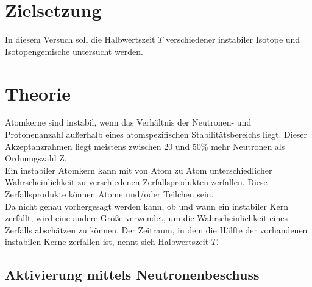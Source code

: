 \section{Zielsetzung}
In diesem Versuch soll die Halbwertszeit $T$ verschiedener instabiler Isotope und Isotopengemische 
untersucht werden.

\section{Theorie}
\label{sec:Theorie}

Atomkerne sind instabil, wenn das Verhältnis der Neutronen- und Protonenanzahl außerhalb eines atomspezifischen
Stabilitätsbereichs liegt. Dieser Akzeptanzrahmen liegt meistens zwischen 20 und 50\% mehr
Neutronen als Ordnungszahl Z.\\
Ein instabiler Atomkern kann mit von Atom zu Atom unterschiedlicher Wahrscheinlichkeit zu verschiedenen
Zerfallsprodukten zerfallen. Diese Zerfallsprodukte können Atome und/oder Teilchen sein.\\
Da nicht genau vorhergesagt werden kann, ob und wann ein instabiler Kern zerfällt, wird eine andere Größe verwendet, 
um die Wahrscheinlichkeit eines Zerfalls abschätzen zu können. Der Zeitraum, in dem die Hälfte der 
vorhandenen instabilen Kerne zerfallen ist, nennt sich Halbwertszeit $T$.\\

\subsection{Aktivierung mittels Neutronenbeschuss}

